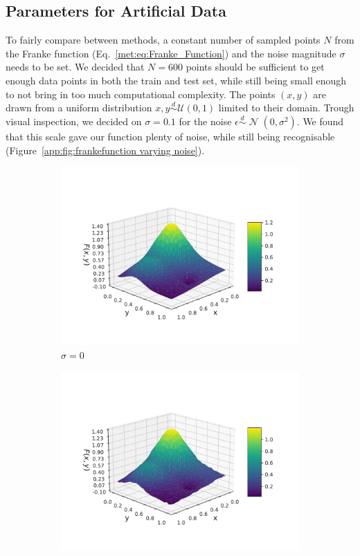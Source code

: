 \documentclass[twocolumn,english,notitlepage]{article}
\newcommand{\pclosed}[1]{\left(#1\right)}
\newcommand{\normal}[2]{\operatorname{\mathcal{N}}\pclosed{#1,#2}}
\newcommand{\distas}{\overset{d}{\sim}}
\begin{document}
\begin{appendices}
    \section{Parameters for Artificial Data} \label{app:sec:frankefunction N and sigma}
        To fairly compare between methods, a constant number of sampled points $N$ from the Franke function (Eq.~\ref{met:eq:Franke_Function}) and the noise magnitude $\sigma$ needs to be set. We decided that $N = 600$ points should be sufficient to get enough data points in both the train and test set, while still being small enough to not bring in too much computational complexity. The points $(x,y)$ are drawn from a uniform distribution $x,y \distas \mathcal{U}(0,1)$ limited to their domain. Trough visual inspection, we decided on $\sigma = 0.1$ for the noise $\epsilon \distas \normal{0}{\sigma^2}$. We found that this scale gave our function plenty of noise, while still being recognisable (Figure~\ref{app:fig:frankefunction varying noise}).   
        \begin{figure}
            \begin{subfigure}{.5\textwidth}
                \centering
                \includegraphics[width=.9\linewidth]{franke_functions_0.pdf}
                \caption{$\sigma = 0$}
                \end{subfigure}
            \hfill
            \begin{subfigure}{.5\textwidth}
                \centering
                \includegraphics[width=.9\linewidth]{franke_functions_0_01.pdf}

\end{subfigure}
\end{figure}
\end{appendices}
\end{document}
